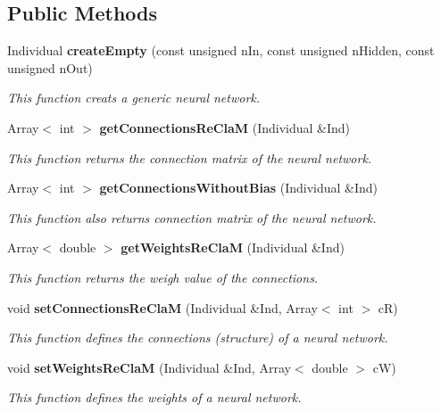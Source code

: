 \subsection*{Public Methods}
\begin{CompactItemize}
\item 
Individual {\bf create\-Empty} (const unsigned n\-In, const unsigned n\-Hidden, const unsigned n\-Out)
\begin{CompactList}\small\item\em This function creats a generic neural network.\item\end{CompactList}\item 
Array$<$ int $>$ {\bf get\-Connections\-Re\-Cla\-M} (Individual \&Ind)
\begin{CompactList}\small\item\em This function returns the connection matrix of the neural network.\item\end{CompactList}\item 
Array$<$ int $>$ {\bf get\-Connections\-Without\-Bias} (Individual \&Ind)
\begin{CompactList}\small\item\em This function also returns connection matrix of the neural network.\item\end{CompactList}\item 
Array$<$ double $>$ {\bf get\-Weights\-Re\-Cla\-M} (Individual \&Ind)
\begin{CompactList}\small\item\em This function returns the weigh value of the connections.\item\end{CompactList}\item 
void {\bf set\-Connections\-Re\-Cla\-M} (Individual \&Ind, Array$<$ int $>$ c\-R)
\begin{CompactList}\small\item\em This function defines the connections (structure) of a neural network.\item\end{CompactList}\item 
void {\bf set\-Weights\-Re\-Cla\-M} (Individual \&Ind, Array$<$ double $>$ c\-W)
\begin{CompactList}\small\item\em This function defines the weights of a neural network.\item\end{CompactList}\item 

\end{CompactItemize}
